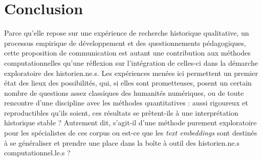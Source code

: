 \documentclass[final, fra]{anthology-ch}     %
\begin{document}
\section{Conclusion}
Parce qu’elle repose sur une expérience de recherche historique qualitative, un processus empirique de développement et des questionnements pédagogiques, cette proposition de communication est autant une contribution aux méthodes computationnelles qu’une réflexion sur l’intégration de celles-ci dans la démarche exploratoire des historien.ne.s. Les expériences menées ici permettent un premier état des lieux des possibilités, qui, si elles sont prometteuses, posent un certain nombre de questions assez classiques des humanités numériques, ou de toute rencontre d’une discipline avec les méthodes quantitatives : aussi rigoureux et reproductibles qu’ils soient, ces résultats se prêtent-ils à une interprétation historique stable ? Autrement dit, s’agit-il d’une méthode purement exploratoire pour les spécialistes de ces corpus ou est-ce que les \textit{text embeddings} sont destinés à se généraliser et prendre une place dans la boîte à outil des historien.ne.s computationnel.le.s \cite{Grandjean2026}?

\printbibliography
\end{document}
